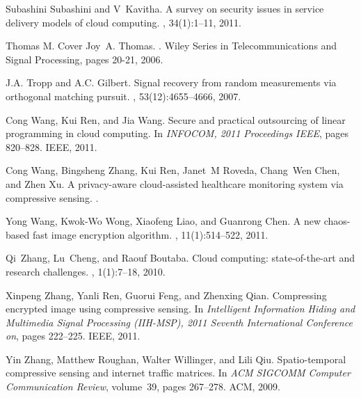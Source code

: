 \documentclass[conference]{IEEEtran}
\begin{document}
\begin{thebibliography}{10}
Subashini Subashini and V~Kavitha.
\newblock A survey on security issues in service delivery models of cloud
  computing.
, 34(1):1--11,
  2011.

Thomas M. Cover Joy~A. Thomas.
.
\newblock Wiley Series in Telecommunications and Signal Processing, pages
  20-21, 2006.

J.A. Tropp and A.C. Gilbert.
\newblock Signal recovery from random measurements via orthogonal matching
  pursuit.
, 53(12):4655--4666,
  2007.

Cong Wang, Kui Ren, and Jia Wang.
\newblock Secure and practical outsourcing of linear programming in cloud
  computing.
\newblock In {\em INFOCOM, 2011 Proceedings IEEE}, pages 820--828. IEEE, 2011.

Cong Wang, Bingsheng Zhang, Kui Ren, Janet~M Roveda, Chang~Wen Chen, and Zhen
  Xu.
\newblock A privacy-aware cloud-assisted healthcare monitoring system via
  compressive sensing.
.

Yong Wang, Kwok-Wo Wong, Xiaofeng Liao, and Guanrong Chen.
\newblock A new chaos-based fast image encryption algorithm.
, 11(1):514--522, 2011.

Qi~Zhang, Lu~Cheng, and Raouf Boutaba.
\newblock Cloud computing: state-of-the-art and research challenges.
, 1(1):7--18,
  2010.

Xinpeng Zhang, Yanli Ren, Guorui Feng, and Zhenxing Qian.
\newblock Compressing encrypted image using compressive sensing.
\newblock In {\em Intelligent Information Hiding and Multimedia Signal
  Processing (IIH-MSP), 2011 Seventh International Conference on}, pages
  222--225. IEEE, 2011.

Yin Zhang, Matthew Roughan, Walter Willinger, and Lili Qiu.
\newblock Spatio-temporal compressive sensing and internet traffic matrices.
\newblock In {\em ACM SIGCOMM Computer Communication Review}, volume~39, pages
  267--278. ACM, 2009.

\end{thebibliography}
\end{document}
